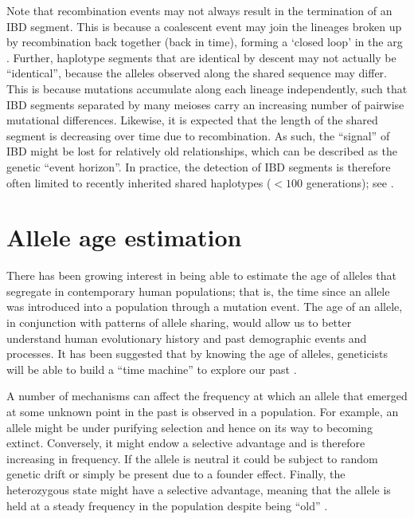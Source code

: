 Note that recombination events may not always result in the termination of an IBD segment.
This is because a coalescent event may join the  lineages broken up by recombination back together (back in time), forming a `closed loop' in the \gls{arg} \citep[see][Theorem~2.4]{griffiths1997ancestral}.
Further, haplotype segments that are identical by descent may not actually be ``identical'', because the alleles observed along the shared sequence may differ.
This is because mutations accumulate along each lineage independently, such that IBD segments separated by many meioses carry an increasing number of pairwise mutational differences.
Likewise, it is expected that the length of the shared segment is decreasing over time due to recombination.
As such, the ``signal'' of IBD might be lost for relatively old relationships, which can be described as the genetic ``event horizon''.
In practice, the detection of IBD segments is therefore often limited to recently inherited shared haplotypes (\eg $<100$ generations); see \citet{Browning:2008es}.



%
\section{Allele age estimation}
\label{sec:alleleage}
%

There has been growing interest in being able to estimate the age of alleles that segregate in contemporary human populations; that is, the time since an allele was introduced into a population through a mutation event.
The age of an allele, in conjunction with patterns of allele sharing, would allow us to better understand human evolutionary history and past demographic events and processes.
It has been suggested that by knowing the age of alleles, geneticists will be able to build a ``time machine'' to explore our past \citep{Slatkin:2000us}.

A number of mechanisms can affect the frequency at which an allele that emerged at some unknown point in the past is observed in a population.
For example, an allele might be under purifying selection and hence on its way to becoming extinct.
Conversely, it might endow a selective advantage and is therefore increasing in frequency.
If the allele is neutral it could be subject to random genetic drift or simply be present due to a founder effect.
Finally, the heterozygous state might have a selective advantage, meaning that the allele is held at a steady frequency in the population despite being ``old'' \citep{Colombo:2007ba}.


